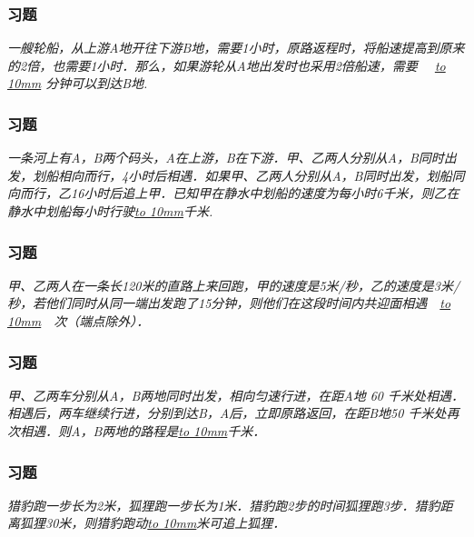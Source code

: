 \begin{frame}
    \frametitle{习题\theframecounter}
    \vspace*{-3cm}
    \textit{一艘轮船，从上游A地开往下游B地，需要1小时，原路返程时，将船速提高到原来的2倍，也需要1小时．那么，如果游轮从A地出发时也采用2倍船速，需要　 \underline{\hbox to 10mm{}} 分钟可以到达B地.}
\end{frame}

\begin{frame}
    \frametitle{习题\theframecounter}
    \vspace*{-3cm}
    \textit{一条河上有A，B两个码头，A在上游，B在下游．甲、乙两人分别从A，B同时出发，划船相向而行，4小时后相遇．如果甲、乙两人分别从A，B同时出发，划船同向而行，乙16小时后追上甲．已知甲在静水中划船的速度为每小时6千米，则乙在静水中划船每小时行驶\underline{\hbox to 10mm{}}千米.}
\end{frame}

\begin{frame}
    \frametitle{习题\theframecounter}
    \vspace*{-3cm}
    \textit{甲、乙两人在一条长120米的直路上来回跑，甲的速度是5米/秒，乙的速度是3米/秒，若他们同时从同一端出发跑了15分钟，则他们在这段时间内共迎面相遇　\underline{\hbox to 10mm{}}　次（端点除外）．}
\end{frame}

\begin{frame}
    \frametitle{习题\theframecounter}
    \vspace*{-3cm}
    \textit{甲、乙两车分别从A，B两地同时出发，相向匀速行进，在距A地 60 千米处相遇．相遇后，两车继续行进，分别到达B，A后，立即原路返回，在距B地50 千米处再次相遇．则A，B两地的路程是\underline{\hbox to 10mm{}}千米．}
\end{frame}

\begin{frame}
    \frametitle{习题\theframecounter}
    \vspace*{-3cm}
    \textit{猎豹跑一步长为2米，狐狸跑一步长为1米．猎豹跑2步的时间狐狸跑3步．猎豹距离狐狸30米，则猎豹跑动\underline{\hbox to 10mm{}}米可追上狐狸．}
\end{frame}
